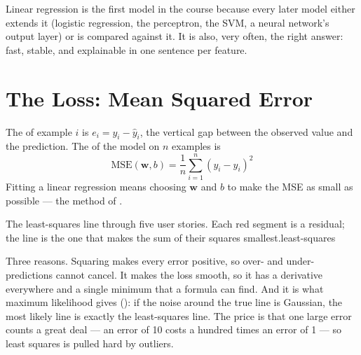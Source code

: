 Linear regression is the first model in the course because every later model
either extends it (logistic regression, the perceptron, the SVM, a neural
network's output layer) or is compared against it. It is also, very often, the
right answer: fast, stable, and explainable in one sentence per feature.

\section{The Loss: Mean Squared Error}

\begin{definitionbox}
The  of example $i$ is $e_i = y_i - \hat{y}_i$, the vertical gap
between the observed value and the prediction. The  of
the model on $n$ examples is
\[
\text{MSE}(\mathbf{w}, b) = \frac{1}{n}\sum_{i=1}^{n}\left(y_i - \hat{y}_i\right)^2
\]
Fitting a linear regression means choosing $\mathbf{w}$ and $b$ to make the MSE
as small as possible --- the method of .
\end{definitionbox}

%
{The least-squares line through five user stories. Each red segment is a residual; the
line is the one that makes the sum of their squares smallest.}{least-squares}

\begin{conceptbox}
Three reasons. Squaring makes every error positive, so over- and under-predictions
cannot cancel. It makes the loss smooth, so it has a derivative everywhere and a
single minimum that a formula can find. And it is what maximum likelihood gives
(): if the noise around the true line is Gaussian, the most likely
line is exactly the least-squares line. The price is that one large error
counts a great deal --- an error of 10 costs a hundred times an error of 1 ---
so least squares is pulled hard by outliers.
\end{conceptbox}

